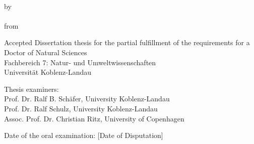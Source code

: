 \begin{titlepage}
    \begin{center}

        \large
        \begingroup
            \vspace{4cm}
            \textbf{\LARGE\spacedallcaps{\myTitleOnTitlePageLineOne}}\\[0.5em]
            \spacedallcaps{\myTitleOnTitlePageLineTwo}
        \endgroup
        
        \vfill

        \begingroup
            by\\[1em]
            \Large \spacedlowsmallcaps{\myName} \\
            \small from \spacedlowsmallcaps{\myLocation}
        \endgroup

        \vfill

        \begingroup
            \small
            Accepted Dissertation thesis for the partial fulfillment of the requirements for a \\
            Doctor of Natural Sciences \\
            Fachbereich 7: Natur- und Umweltwissenschaften \\
            Universität Koblenz-Landau
        \endgroup

        \vfill

        \begingroup
            \small
            Thesis examiners: \\
            Prof. Dr. Ralf B. Schäfer, University Koblenz-Landau\\
            Prof. Dr. Ralf Schulz, University Koblenz-Landau\\
            Assoc. Prof. Dr. Christian Ritz, University of Copenhagen
        \endgroup

        \vfill

        \begingroup
            \small
            Date of the oral examination: [Date of Disputation]
        \endgroup
        
        \vfill                      

    \end{center}       
\end{titlepage}   
 
